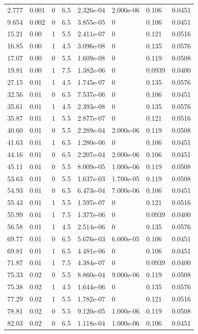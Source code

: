 \documentclass[preview]{standalone}
\begin{document}
{{\begin{tabular}{L{1.2cm}C{1.2cm} C{0.3cm}C{0.5cm} C{1.4cm}C{1.4cm} C{1.4cm}C{1.4cm}}
  2.777  &  0.001  & 0     & 6.5 &  2.326e-04  & 2.000e-06  & 0.106 &  0.0451   \\ 
  9.654  &  0.002  & 0     & 6.5 &  3.855e-05  & 0  & 0.106 &  0.0451   \\ 
  15.21  &  0.00  & 1     & 5.5 &  2.411e-07  & 0  & 0.121 &  0.0516   \\ 
  16.85  &  0.00  & 1     & 4.5 &  3.096e-08  & 0  & 0.135 &  0.0576   \\ 
  17.07  &  0.00  & 0     & 5.5 &  1.609e-08  & 0  & 0.119 &  0.0508   \\ 
  19.81  &  0.00  & 1     & 7.5 &  1.382e-06  & 0  & 0.0939 &  0.0400   \\ 
  27.15  &  0.01  & 1     & 4.5 &  1.745e-07  & 0  & 0.135 &  0.0576   \\ 
  32.56  &  0.01  & 0     & 6.5 &  7.537e-06  & 0  & 0.106 &  0.0451   \\ 
  35.61  &  0.01  & 1     & 4.5 &  2.393e-08  & 0  & 0.135 &  0.0576   \\ 
  35.87  &  0.01  & 1     & 5.5 &  2.877e-07  & 0  & 0.121 &  0.0516   \\ 
  40.60  &  0.01  & 0     & 5.5 &  2.289e-04  & 2.000e-06  & 0.119 &  0.0508   \\ 
  41.63  &  0.01  & 1     & 6.5 &  1.280e-06  & 0  & 0.106 &  0.0451   \\ 
  44.16  &  0.01  & 0     & 6.5 &  2.207e-04  & 2.000e-06  & 0.106 &  0.0451   \\ 
  45.11  &  0.01  & 0     & 5.5 &  8.009e-05  & 1.000e-06  & 0.119 &  0.0508   \\ 
  53.63  &  0.01  & 0     & 5.5 &  1.637e-03  & 1.700e-05  & 0.119 &  0.0508   \\ 
  54.93  &  0.01  & 0     & 6.5 &  6.473e-04  & 7.000e-06  & 0.106 &  0.0451   \\ 
  55.43  &  0.01  & 1     & 5.5 &  1.597e-07  & 0  & 0.121 &  0.0516   \\ 
  55.99  &  0.01  & 1     & 7.5 &  1.377e-06  & 0  & 0.0939 &  0.0400   \\ 
  56.58  &  0.01  & 1     & 4.5 &  2.514e-06  & 0  & 0.135 &  0.0576   \\ 
  69.77  &  0.01  & 0     & 6.5 &  5.676e-03  & 6.000e-05  & 0.106 &  0.0451   \\ 
  69.81  &  0.01  & 1     & 6.5 &  4.481e-06  & 0  & 0.106 &  0.0451   \\ 
  71.87  &  0.01  & 1     & 7.5 &  4.384e-07  & 0  & 0.0939 &  0.0400   \\ 
  75.33  &  0.02  & 0     & 5.5 &  8.860e-04  & 9.000e-06  & 0.119 &  0.0508   \\ 
  75.38  &  0.02  & 1     & 4.5 &  1.644e-06  & 0  & 0.135 &  0.0576   \\ 
  77.29  &  0.02  & 1     & 5.5 &  1.782e-07  & 0  & 0.121 &  0.0516   \\ 
  78.81  &  0.02  & 0     & 5.5 &  9.120e-05  & 1.000e-06  & 0.119 &  0.0508   \\ 
  82.03  &  0.02  & 0     & 6.5 &  1.118e-04  & 1.000e-06  & 0.106 &  0.0451   \\ 
\hline 
\end{tabular} 

}}
\end{document}

